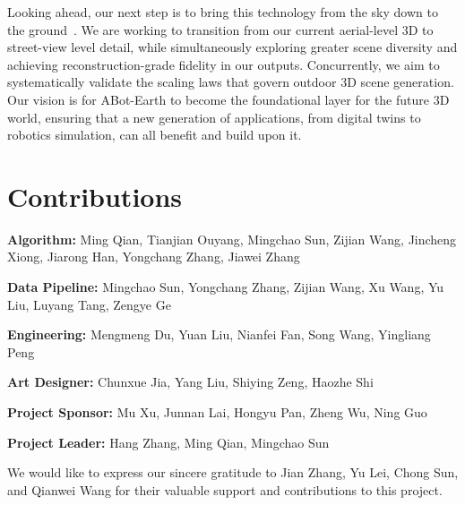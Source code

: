 \documentclass{llmxive}
\begin{document}
Looking ahead, our next step is to bring this technology from the sky down to the ground~\cite{qian2026sat3dgen}. We are working to transition from our current aerial-level 3D to street-view level detail, while simultaneously exploring greater scene diversity and achieving reconstruction-grade fidelity in our outputs. Concurrently, we aim to systematically validate the scaling laws that govern outdoor 3D scene generation. Our vision is for ABot-Earth to become the foundational layer for the future 3D world, ensuring that a new generation of applications, from digital twins to robotics simulation, can all benefit and build upon it.


% 
\section{Contributions}

\textbf{Algorithm:} Ming Qian,  Tianjian Ouyang,  Mingchao Sun,  Zijian Wang, Jincheng Xiong, Jiarong Han, Yongchang Zhang,  Jiawei Zhang

\textbf{Data Pipeline:}  Mingchao Sun, Yongchang Zhang,  Zijian Wang, Xu Wang, Yu Liu, Luyang Tang, Zengye Ge

\textbf{Engineering:} Mengmeng Du, Yuan Liu,  Nianfei Fan, Song Wang, Yingliang Peng

\textbf{Art Designer:} Chunxue Jia, Yang Liu, Shiying Zeng,  Haozhe Shi


\textbf{Project Sponsor:} Mu Xu,  Junnan Lai,  Hongyu Pan,  Zheng Wu, Ning Guo

\textbf{Project Leader:} Hang Zhang, Ming Qian, Mingchao Sun


We would like to express our sincere gratitude to Jian Zhang, Yu Lei, Chong Sun, and Qianwei Wang for their valuable support and contributions to this project.





\end{document}
